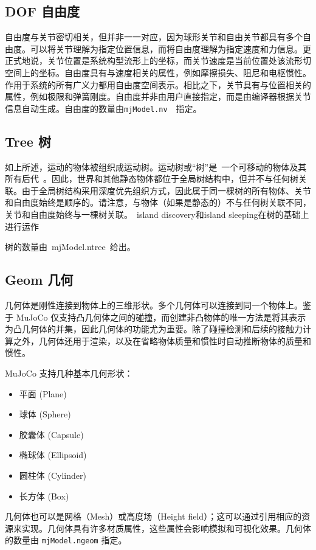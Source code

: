 \subsection{DOF 自由度}
自由度与关节密切相关，但并非一一对应，因为球形关节和自由关节都具有多个自由度。可以将关节理解为指定位置信息，而将自由度理解为指定速度和力信息。更正式地说，关节位置是系统构型流形上的坐标，而关节速度是当前位置处该流形切空间上的坐标。自由度具有与速度相关的属性，例如摩擦损失、阻尼和电枢惯性。作用于系统的所有广义力都用自由度空间表示。相比之下，关节具有与位置相关的属性，例如极限和弹簧刚度。自由度并非由用户直接指定，而是由编译器根据关节信息自动生成。自由度的数量由\texttt{mjModel.nv}  指定。


\subsection{Tree 树}
如上所述，运动的物体被组织成运动树。运动树或“树”是 一个可移动的物体及其所有后代 。因此，世界和其他静态物体都位于全局树结构中，但并不与任何树关联。由于全局树结构采用深度优先组织方式，因此属于同一棵树的所有物体、关节和自由度始终是顺序的。请注意，与物体（如果是静态的）不与任何树关联不同，关节和自由度始终与一棵树关联。 island discovery和island sleeping在树的基础上进行运作

树的数量由 mjModel.ntree 给出。

\subsection{Geom 几何}
几何体是刚性连接到物体上的三维形状。多个几何体可以连接到同一个物体上。鉴于 MuJoCo 仅支持凸几何体之间的碰撞，而创建非凸物体的唯一方法是将其表示为凸几何体的并集，因此几何体的功能尤为重要。除了碰撞检测和后续的接触力计算之外，几何体还用于渲染，以及在省略物体质量和惯性时自动推断物体的质量和惯性。

MuJoCo 支持几种基本几何形状：
\begin{itemize}
	\item 平面 (Plane)
	\item 球体 (Sphere)
	\item 胶囊体 (Capsule)
	\item 椭球体 (Ellipsoid)
	\item 圆柱体 (Cylinder)
	\item 长方体 (Box)
\end{itemize}
几何体也可以是网格（Mesh）或高度场（Height field）；这可以通过引用相应的资源来实现。几何体具有许多材质属性，这些属性会影响模拟和可视化效果。几何体的数量由 \texttt{mjModel.ngeom} 指定。



